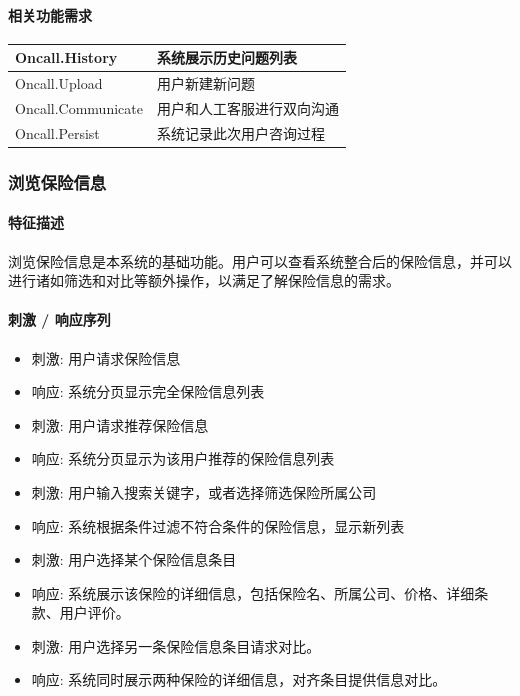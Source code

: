 \documentclass[a4paper]{ctexart}
\begin{document}
\paragraph{相关功能需求}

\begin{center}
  \begin{tabular}{p{6cm}|p{8cm}}
    \toprule
    Oncall.History & 系统展示历史问题列表 \\
    \midrule
    Oncall.Upload & 用户新建新问题 \\
    \midrule
    Oncall.Communicate & 用户和人工客服进行双向沟通 \\
    \midrule
    Oncall.Persist & 系统记录此次用户咨询过程 \\
    \bottomrule
  \end{tabular}
\end{center}

\subsubsection{浏览保险信息}

\paragraph{特征描述}

浏览保险信息是本系统的基础功能。用户可以查看系统整合后的保险信息，并可以进行诸如筛选和对比等额外操作，以满足了解保险信息的需求。

\paragraph{刺激 / 响应序列}

\begin{itemize}
  \item 刺激: 用户请求保险信息
  \item 响应: 系统分页显示完全保险信息列表
  \item 刺激: 用户请求推荐保险信息
  \item 响应: 系统分页显示为该用户推荐的保险信息列表
  \item 刺激: 用户输入搜索关键字，或者选择筛选保险所属公司
  \item 响应: 系统根据条件过滤不符合条件的保险信息，显示新列表
  \item 刺激: 用户选择某个保险信息条目
  \item 响应: 系统展示该保险的详细信息，包括保险名、所属公司、价格、详细条款、用户评价。
  \item 刺激: 用户选择另一条保险信息条目请求对比。
  \item 响应: 系统同时展示两种保险的详细信息，对齐条目提供信息对比。
\end{itemize}
\end{document}
